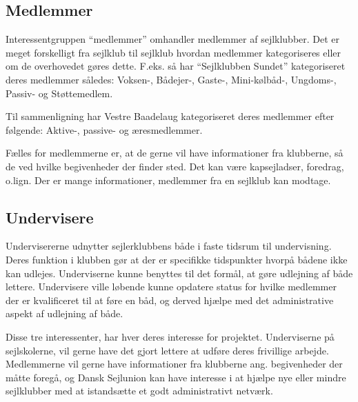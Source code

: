 \subsection{Medlemmer}

Interessentgruppen ``medlemmer'' omhandler medlemmer af sejlklubber. Det er meget forskelligt fra sejlklub til
sejlklub hvordan medlemmer kategoriseres eller om de overhovedet gøres dette. F.eks. så har ``Sejlklubben
Sundet'' kategoriseret deres medlemmer således: Voksen-, Bådejer-, Gaste-, Mini-kølbåd-, Ungdoms-, Passiv- og
Støttemedlem.

Til sammenligning har Vestre Baadelaug kategoriseret deres medlemmer efter følgende: Aktive-, passive- og
æresmedlemmer.

Fælles for medlemmerne er, at de gerne vil have informationer fra klubberne, så de ved hvilke begivenheder der finder sted. Det kan være kapsejladser, foredrag, o.lign. Der er mange informationer, medlemmer fra en sejlklub kan modtage.



\subsection{Undervisere}

Undervisererne udnytter sejlerklubbens både i faste tidsrum til undervisning. Deres funktion i
klubben gør at der er specifikke tidspunkter hvorpå bådene ikke kan udlejes. Underviserne kunne benyttes til
det formål, at gøre udlejning af både lettere. Undervisere ville løbende kunne opdatere status for hvilke
medlemmer der er kvalificeret til at føre en båd, og derved hjælpe med det administrative aspekt af udlejning
af både.

Disse tre interessenter, har hver deres interesse for projektet. Underviserne på sejlskolerne, vil gerne have det gjort lettere at udføre deres frivillige arbejde. Medlemmerne vil gerne have informationer fra klubberne ang. begivenheder der måtte foregå, og Dansk Sejlunion kan have interesse i at hjælpe nye eller mindre sejlklubber med at istandsætte et godt administrativt netværk.